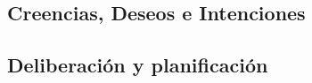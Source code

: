 \subsection{Creencias, Deseos e Intenciones}
\label{sub:creencia_deseos_intenciones}
 
 
 
 
 

\subsection{Deliberación y planificación}
\label{sub:deliberacion_planificacion}
 
 
